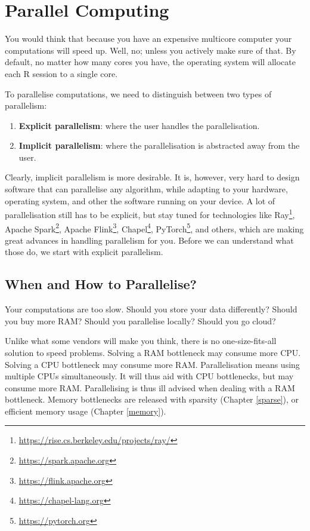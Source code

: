 \documentclass[]{book}
\providecommand{\tightlist}{%
  \setlength{\itemsep}{0pt}\setlength{\parskip}{0pt}}
\renewcommand{\href}[2]{#2\footnote{\url{#1}}}
\theoremstyle{definition}
\theoremstyle{definition}
\theoremstyle{definition}
\theoremstyle{remark}
\begin{document}
\hypertarget{parallel}{%
\chapter{Parallel Computing}\label{parallel}}

You would think that because you have an expensive multicore computer your computations will speed up.
Well, no; unless you actively make sure of that.
By default, no matter how many cores you have, the operating system will allocate each R session to a single core.

To parallelise computations, we need to distinguish between two types of parallelism:

\begin{enumerate}
\def\labelenumi{\arabic{enumi}.}
\tightlist
\item
  \textbf{Explicit parallelism}: where the user handles the parallelisation.
\item
  \textbf{Implicit parallelism}: where the parallelisation is abstracted away from the user.
\end{enumerate}

Clearly, implicit parallelism is more desirable.
It is, however, very hard to design software that can parallelise any algorithm, while adapting to your hardware, operating system, and other the software running on your device.
A lot of parallelisation still has to be explicit, but stay tuned for technologies like \href{https://rise.cs.berkeley.edu/projects/ray/}{Ray}, \href{https://spark.apache.org}{Apache Spark}, \href{https://flink.apache.org}{Apache Flink}, \href{https://chapel-lang.org}{Chapel}, \href{https://pytorch.org}{PyTorch}, and others, which are making great advances in handling parallelism for you.
Before we can understand what those do, we start with explicit parallelism.

\hypertarget{when-and-how-to-parallelise}{%
\section{When and How to Parallelise?}\label{when-and-how-to-parallelise}}

Your computations are too slow.
Should you store your data differently?
Should you buy more RAM?
Should you parallelise locally?
Should you go cloud?

Unlike what some vendors will make you think, there is no one-size-fits-all solution to speed problems.
Solving a RAM bottleneck may consume more CPU.
Solving a CPU bottleneck may consume more RAM.
Parallelisation means using multiple CPUs simultaneously.
It will thus aid with CPU bottlenecks, but may consume more RAM.
Parallelising is thus ill advised when dealing with a RAM bottleneck.
Memory bottlenecks are released with sparsity (Chapter \ref{sparse}), or efficient memory usage (Chapter \ref{memory}).
\end{document}

